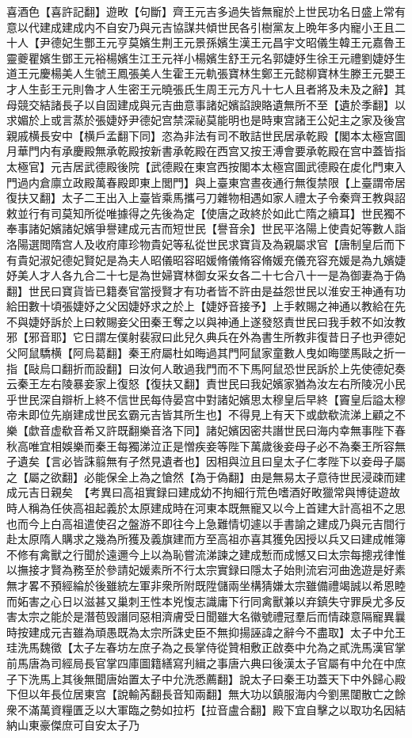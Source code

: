 喜酒色【喜許記翻】遊畋【句斷】齊王元吉多過失皆無寵於上世民功名日盛上常有意以代建成建成内不自安乃與元吉協謀共傾世民各引樹黨友上晩年多内寵小王且二十人【尹德妃生酆王元亨莫嬪生荆王元景孫嬪生漢王元昌宇文昭儀生韓王元嘉魯王靈夔瞿嬪生鄧王元裕楊嬪生江王元祥小楊嬪生舒王元名郭婕妤生徐王元禮劉婕妤生道王元慶楊美人生虢王鳳張美人生霍王元軌張寶林生鄭王元懿柳寶林生滕王元嬰王才人生彭王元則魯才人生密王元曉張氏生周王元方凡十七人且者將及未及之辭】其母競交結諸長子以自固建成與元吉曲意事諸妃嬪諂諛賂遺無所不至【遺於季翻】以求媚於上或言蒸於張婕妤尹德妃宫禁深祕莫能明也是時東宫諸王公妃主之家及後宫親戚横長安中【横戶孟翻下同】恣為非法有司不敢詰世民居承乾殿【閣本太極宫圖月華門内有承慶殿無承乾殿按新書承乾殿在西宫又按王溥會要承乾殿在宫中蓋皆指太極官】元吉居武德殿後院【武德殿在東宫西按閣本太極宫圖武德殿在䖍化門東入門過内倉廪立政殿萬春殿即東上閭門】與上臺東宫晝夜通行無復禁限【上臺謂帝居復扶又翻】太子二王出入上臺皆乘馬攜弓刀雜物相遇如家人禮太子令秦齊王教與詔敕並行有司莫知所從唯據得之先後為定【使唐之政終於如此亡隋之續耳】世民獨不奉事諸妃嬪諸妃嬪爭譽建成元吉而短世民【譽音余】世民平洛陽上使貴妃等數人詣洛陽選閲隋宫人及收府庫珍物貴妃等私從世民求寶貨及為親屬求官【唐制皇后而下有貴妃淑妃德妃賢妃是為夫人昭儀昭容昭媛脩儀脩容脩媛充儀充容充媛是為九嬪婕妤美人才人各九合二十七是為世婦寶林御女采女各二十七合八十一是為御妻為于偽翻】世民曰寶貨皆已籍奏官當授賢才有功者皆不許由是益怨世民以淮安王神通有功給田數十頃張婕妤之父因婕妤求之於上【婕妤音接予】上手敕賜之神通以教給在先不與婕妤訴於上曰敕賜妾父田秦王奪之以與神通上遂發怒責世民曰我手敕不如汝教邪【邪音耶】它日謂左僕射裴寂曰此兒久典兵在外為書生所教非復昔日子也尹德妃父阿鼠驕横【阿烏葛翻】秦王府屬杜如晦過其門阿鼠家童數人曳如晦墜馬敺之折一指【敺烏口翻折而設翻】曰汝何人敢過我門而不下馬阿鼠恐世民訴於上先使德妃奏云秦王左右陵暴妾家上復怒【復扶又翻】責世民曰我妃嬪家猶為汝左右所陵况小民乎世民深自辯析上終不信世民每侍晏宫中對諸妃嬪思太穆皇后早終【竇皇后謚太穆帝未即位先崩建成世民玄霸元吉皆其所生也】不得見上有天下或歔欷流涕上顧之不樂【歔音虚欷音希又許既翻樂音洛下同】諸妃嬪因密共譖世民曰海内幸無事陛下春秋高唯宜相娛樂而秦王每獨涕泣正是憎疾妾等陛下萬歲後妾母子必不為秦王所容無孑遺矣【言必皆誅翦無有孑然見遺者也】因相與泣且曰皇太子仁孝陛下以妾母子屬之【屬之欲翻】必能保全上為之愴然【為于偽翻】由是無易太子意待世民浸疎而建成元吉日親矣　【考異曰高祖實録曰建成幼不拘細行荒色嗜酒好畋獵常與博徒遊故時人稱為任俠高祖起義於太原建成時在河東本既無寵又以今上首建大計高祖不之思也而今上白高祖遣使召之盤游不即往今上急難情切遽以手書諭之建成乃與元吉間行赴太原隋人購求之幾為所獲及義旗建而方至高祖亦喜其獲免因授以兵又曰建成帷簿不修有禽獸之行聞於遠邇今上以為恥嘗流涕諫之建成慙而成憾又曰太宗每摠戎律惟以撫接才賢為務至於參請妃媛素所不行太宗實録曰隱太子始則流宕河曲逸遊是好素無才畧不預經綸於後雖統左軍非衆所附既陞儲兩坐構猜嫌太宗雖備禮竭誠以希恩睦而妬害之心日以滋甚又巢刺王性本兇愎志識庸下行同禽獸兼以弃鎮失守罪戾尤多反害太宗之能於是潛苞毁譖同惡相濟膚受日聞雖大名徽號禮冠羣后而情疎意隔寵異曩時按建成元吉雖為頑愚既為太宗所誅史臣不無抑揚誣諱之辭今不盡取】太子中允王珪洗馬魏徵【太子左春坊左庶子為之長掌侍從贊相敷正啟奏中允為之貳洗馬漢官掌前馬唐為司經局長官掌四庫圖籍繕寫刋緝之事唐六典曰後漢太子官屬有中允在中庶子下洗馬上其後無聞唐始置太子中允洗悉薦翻】說太子曰秦王功蓋天下中外歸心殿下但以年長位居東宫【說輸芮翻長音知兩翻】無大功以鎮服海内今劉黑闥散亡之餘衆不滿萬資糧匱乏以大軍臨之勢如拉朽【拉音盧合翻】殿下宜自擊之以取功名因結納山東豪傑庶可自安太子乃